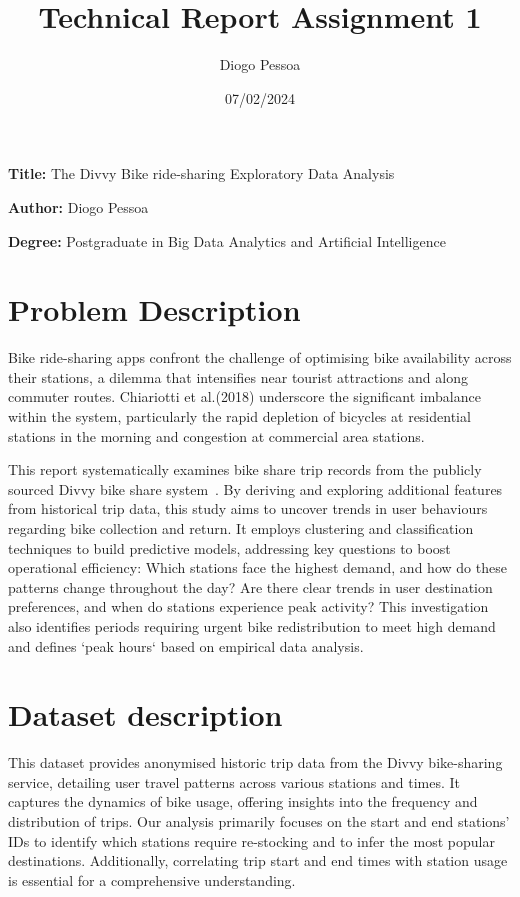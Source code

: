 \documentclass[12pt, a4paper]{article}
\title{Technical Report Assignment 1}
\author{Diogo Pessoa}
\date{07/02/2024}
\newcommand{\namelistlabel}[1]{\mbox{#1}\hfil}
\newenvironment{namelist}[1]{%
    \begin{list}{}
    {
        \let\makelabel\namelistlabel
        \settowidth{\labelwidth}{#1}
        \setlength{\leftmargin}{1.1\labelwidth}
    }
    }{%
    \end{list}}
\begin{document}
    \maketitle
    \begin{namelist}{xxxxxxxxxxxx}
        \item[\textbf{Title:}]
        The Divvy Bike ride-sharing Exploratory Data Analysis
        \item[\textbf{Author:}]
        Diogo Pessoa
        \item[\textbf{Degree:}]
        Postgraduate in Big Data Analytics and Artificial Intelligence
    \end{namelist}

    \section*{Problem Description}
    \label{sec:ProblemDescription}
    Bike ride-sharing apps confront the challenge of optimising bike availability across their stations, a dilemma that intensifies near tourist attractions and along commuter routes.
    Chiariotti et al.(2018)\cite{s18020512} underscore the significant imbalance within the system,
    particularly the rapid depletion of bicycles at residential stations in the morning and congestion at commercial area stations.

    This report systematically examines bike share trip records from the publicly sourced Divvy bike share system~\cite{DataSource}.
    By deriving and exploring additional features from historical trip data, this study aims to uncover trends in user behaviours regarding bike collection and return.
    It employs clustering and classification techniques to build predictive models, addressing key questions to boost operational efficiency: Which stations face the highest demand,
    and how do these patterns change throughout the day?
    Are there clear trends in user destination preferences, and when do stations experience peak activity?
    This investigation also identifies periods requiring urgent bike redistribution to meet high demand and defines `peak hours` based on empirical data analysis.

    \section*{Dataset description}
    \label{sec:dataset}

    This dataset provides anonymised historic trip data from the Divvy bike-sharing service, detailing user travel patterns across various stations and times.
    It captures the dynamics of bike usage, offering insights into the frequency and distribution of trips.
    Our analysis primarily focuses on the start and end stations' IDs to identify which stations require re-stocking and to infer the most popular destinations.
    Additionally, correlating trip start and end times with station usage is essential for a comprehensive understanding.\newline
\end{document}
